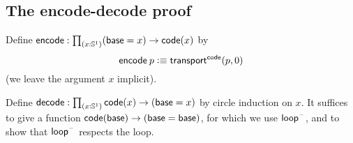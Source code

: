 \documentclass[hott-all.tex]{subfiles}
\begin{document}
\subsection{The encode-decode proof}
% 
\begin{defn}
Define $\encode : \prd{x : \Sn ^1} (\base=x) \rightarrow  \code(x)$ by
\[
\mathsf{encode} \: p \vcentcolon\equiv \mathsf{transport}^{\mathsf{code}}(p,0)
\]
(we leave the argument $x$ implicit).
\end{defn}
% 
% 
% 
\begin{defn}
Define $\decode : \prd{x : \Sn ^1}\code(x) \rightarrow (\base=x)$ by
circle induction on $x$.  It suffices to give a function
${\mathsf{code}(\mathsf{base}) \rightarrow (\mathsf{base}=\mathsf{base})}$, for which we use $\mathsf{loop}^{\mathord{\hspace{1pt}\text{--}\hspace{1pt}}}$, and
to show that $\mathsf{loop}^{\mathord{\hspace{1pt}\text{--}\hspace{1pt}}}$ respects the loop.
\end{defn}
\end{document}
